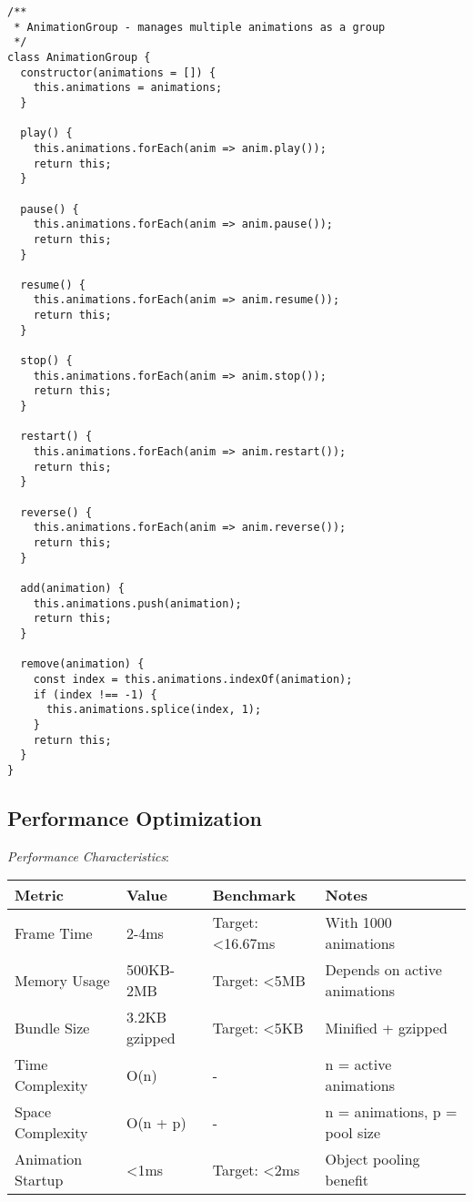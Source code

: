 \documentclass[11pt]{article}
\begin{document}
\begin{verbatim}
/**
 * AnimationGroup - manages multiple animations as a group
 */
class AnimationGroup {
  constructor(animations = []) {
    this.animations = animations;
  }
  
  play() {
    this.animations.forEach(anim => anim.play());
    return this;
  }
  
  pause() {
    this.animations.forEach(anim => anim.pause());
    return this;
  }
  
  resume() {
    this.animations.forEach(anim => anim.resume());
    return this;
  }
  
  stop() {
    this.animations.forEach(anim => anim.stop());
    return this;
  }
  
  restart() {
    this.animations.forEach(anim => anim.restart());
    return this;
  }
  
  reverse() {
    this.animations.forEach(anim => anim.reverse());
    return this;
  }
  
  add(animation) {
    this.animations.push(animation);
    return this;
  }
  
  remove(animation) {
    const index = this.animations.indexOf(animation);
    if (index !== -1) {
      this.animations.splice(index, 1);
    }
    return this;
  }
}
\end{verbatim}
\subsection{Performance Optimization}
\label{sec:orgba53428}

\emph{Performance Characteristics}:

\begin{center}
\begin{tabular}{llll}
Metric & Value & Benchmark & Notes\\
\hline
Frame Time & 2-4ms & Target: <16.67ms & With 1000 animations\\
Memory Usage & 500KB-2MB & Target: <5MB & Depends on active animations\\
Bundle Size & 3.2KB gzipped & Target: <5KB & Minified + gzipped\\
Time Complexity & O(n) & - & n = active animations\\
Space Complexity & O(n + p) & - & n = animations, p = pool size\\
Animation Startup & <1ms & Target: <2ms & Object pooling benefit\\
\end{tabular}
\end{center}
\end{document}
